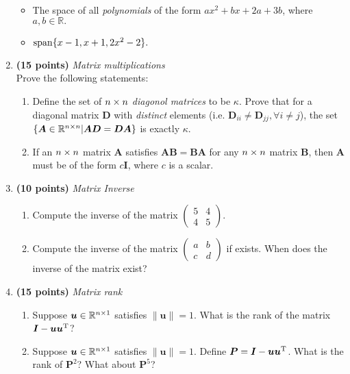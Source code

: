 \begin{enumerate}
\begin{itemize}
\item
The space of all \textit{polynomials} of the form $ax^2+bx+2a+3b$, where $a,b\in\mathbb{R}.$\\
\item
$\operatorname{span}\{x-1,x+1,2x^2-2\}.$
\end{itemize}
\newpage
\item \textbf{(15 points)} \textit{Matrix multiplications}\\
Prove the following statements:
\begin{enumerate}
\item
Define the set of $n\times n$ \textit{diagonol matrices} to be $\kappa$. Prove that for a diagonal matrix $\bm D$ with \textit{distinct} elements (i.e. $\bm D_{ii}\ne\bm D_{jj},\forall i\ne j$), the set $\{\bm A\in\mathbb{R}^{n\times n}|\bm{AD}=\bm{DA}\}$ is exactly $\kappa$.\\
\item
If an $n\times n$ matrix $\bm A$ satisfies $\bm{AB}=\bm{BA}$ for any $n\times n$ matrix $\bm B$, then $\bm A$ must be of the form $c\bm I$, where $c$ is a scalar.
\end{enumerate}
\newpage
\item \textbf{(10 points)} \textit{Matrix Inverse}\\
\begin{enumerate}
\item
Compute the inverse of the matrix $\begin{pmatrix}
5&4\\4&5
\end{pmatrix}.$
\item
Compute the inverse of the matrix $\begin{pmatrix}
a&b\\c&d
\end{pmatrix}$ if exists. When does the inverse of the matrix exist?
\end{enumerate}
\newpage
\item \textbf{(15 points)} \textit{Matrix rank}\\
\begin{enumerate}
\item
Suppose $\bm u\in\mathbb{R}^{n\times 1}$ satisfies $\|\bm u\|=1$. What is the rank of the matrix $\bm I-\bm u\bm u^{\mathrm T}$?\\
\item
Suppose $\bm u\in\mathbb{R}^{n\times 1}$ satisfies $\|\bm u\|=1$. Define $\bm P=\bm I-\bm u\bm u^{\mathrm T}$. What is the rank of $\bm P^2$? What about $\bm P^5$?\\

\end{enumerate}
\end{enumerate}
